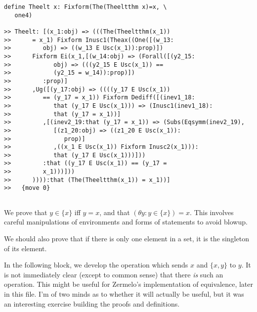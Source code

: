 \documentclass[12pt]{article}
\begin{document}
\begin{verbatim}
define Theelt x: Fixform(The(Theeltthm x)=x, \
   one4)

>> Theelt: [(x_1:obj) => (((The(Theeltthm(x_1))
>>      = x_1) Fixform Inusc1(Theax((One([(w_13:
>>         obj) => ((w_13 E Usc(x_1)):prop)])
>>      Fixform Ei(x_1,[(w_14:obj) => (Forall([(y2_15:
>>            obj) => (((y2_15 E Usc(x_1)) ==
>>            (y2_15 = w_14)):prop)])
>>         :prop)]
>>      ,Ug([(y_17:obj) => ((((y_17 E Usc(x_1))
>>         == (y_17 = x_1)) Fixform Dediff([(inev1_18:
>>            that (y_17 E Usc(x_1))) => (Inusc1(inev1_18):
>>            that (y_17 = x_1))]
>>         ,[(inev2_19:that (y_17 = x_1)) => (Subs(Eqsymm(inev2_19),
>>            [(z1_20:obj) => ((z1_20 E Usc(x_1)):
>>               prop)]
>>            ,((x_1 E Usc(x_1)) Fixform Inusc2(x_1))):
>>            that (y_17 E Usc(x_1)))]))
>>         :that ((y_17 E Usc(x_1)) == (y_17 =
>>         x_1)))]))
>>      )))):that (The(Theeltthm(x_1)) = x_1))]
>>   {move 0}


\end{verbatim}

We prove that $y \in \{x\}$ iff $y=x$, and that $(\theta y: y \in \{x\})=x$.  This involves careful manipulations of environments and forms of statements to avoid blowup.

We should also prove that if there is only one element in a set, it is the singleton of its element.

In the following block, we develop the operation which sends $x$ and $\{x,y\}$ to $y$.  It is not immediately clear (except to common sense) that there
{\em is\/} such an operation.  This might be useful for Zermelo's implementation of equivalence, later in this file.  I'm of two minds as to whether it will actually be useful, but it was an interesting exercise building the proofs and definitions.
\end{document}
